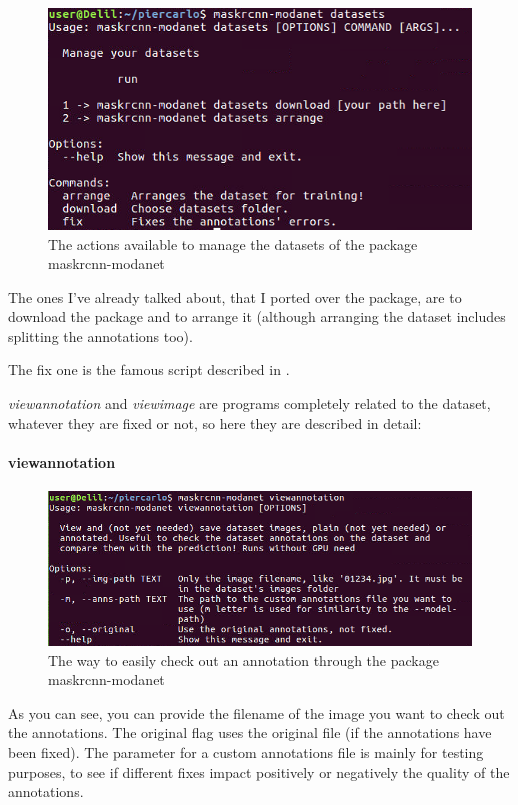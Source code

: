 \begin{figure}[H]
	\centering
	\includegraphics[width=.75\linewidth]{figures/cli/datasets}
	\caption{The actions available to manage the datasets of the package maskrcnn-modanet}
	\label{f:cli-datasets}
\end{figure}

The ones I've already talked about, that I ported over the package, are to download the package and to arrange it (although arranging the dataset includes splitting the annotations too).

The fix one is the famous script described in .

\emph{viewannotation} and \emph{viewimage} are programs completely related to the dataset, whatever they are fixed or not, so here they are described in detail:

\paragraph{viewannotation}

\begin{figure}[H]
	\centering
	\includegraphics[width=.75\linewidth]{figures/cli/viewannotation}
	\caption{The way to easily check out an annotation through the package maskrcnn-modanet}
	\label{f:cli-viewannotation}
\end{figure}

As you can see, you can provide the filename of the image you want to check out the annotations.
The original flag uses the original file (if the annotations have been fixed).
The parameter for a custom annotations file is mainly for testing purposes, to see if different fixes impact positively or negatively the quality of the annotations.

